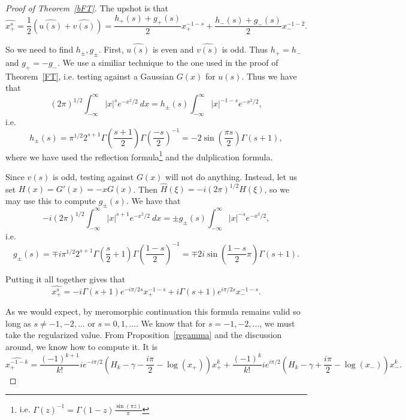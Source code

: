 \documentclass[12pt]{article}
\begin{document}
\begin{proof}[Proof of Theorem~\ref{bFT}]
The upshot is that
\[\widehat{x_+^s} = \frac{1}{2}(\widehat{u(s)} + \widehat{v(s)}) = \frac{h_+(s)+g_+(s)}{2}x_+^{-1-s} + \frac{h_-(s)+g_-(s)}{2}x_-^{-1-2}.\]

So we need to find $h_{\pm},g_{\pm}$.  First, $\widehat{u(s)}$ is even and $\widehat{v(s)}$ is odd. Thus $h_+ = h_-$ and $g_+ = -g_-$. We use a similiar technique to the one used in the proof of Theorem~\ref{FT}, i.e. testing against a Gaussian $G(x)$ for $u(s)$. Thus we have that
\[(2\pi)^{1/2}\int_{-\infty}^\infty |x|^se^{-x^2/2}\ dx = h_{\pm}(s)\int_{-\infty}^\infty|x|^{-1-s}e^{-x^2/2},\]
i.e.
\[h_\pm(s) = \pi^{1/2}2^{s+1}\Gamma\left(\frac{s+1}{2}\right)\Gamma\left(\frac{-s}{2}\right)^{-1} = -2\sin\left(\frac{\pi s}{2}\right)\Gamma(s+1),\]
where we have used the reflection formula\footnote{i.e. $\Gamma(z)^{-1} = \Gamma(1-z)\frac{\sin(\pi z)}{\pi}$} and the dulplication formula.

Since $v(s)$ is odd, testing against $G(x)$ will not do anything. Instead, let us set $H(x) = G'(x) = -xG(x)$. Then $\hat{H}(\xi) = -i(2\pi)^{1/2}H(\xi)$, so we may use this to compute $g_{\pm}(s)$. We have that
\[-i(2\pi)^{1/2}\int_{-\infty}^\infty |x|^{s+1}e^{-x^2/2}\ dx = \pm g_{\pm}(s)\int_{-\infty}^\infty|x|^{-s}e^{-x^2/2},\]
i.e.
\[g_{\pm}(s) = \mp i\pi^{1/2}2^{s+1}\Gamma\left(\frac{s}{2}+1\right)\Gamma\left(\frac{1-s}{2}\right)^{-1} = \mp 2i\sin\left(\frac{1-s}{2}\pi\right)\Gamma(s+1).\]

Putting it all together gives that
\[\widehat{x_+^s} = -i\Gamma(s+1)e^{-i\pi/2 s}x_+^{-1-s} + i\Gamma(s+1)e^{i\pi/2s}x_-^{-1-s}.\]

As we would expect, by meromorphic continuation this formula remains valid so long as $s \neq -1,-2,\ldots$ or $s = 0,1,\ldots$. We know that for $s = -1,-2,\ldots$, we must take the regularized value. From Proposition~\ref{regamma} and the discussion around, we know how to compute it. It is
\[\widehat{x_+^{-1-k}} = \frac{(-1)^{k+1}}{k!}ie^{-i\pi/2}\left(H_k-\gamma-\frac{i\pi}{2}-\log(x_+)\right)x_+^k + \frac{(-1)^{k}}{k!}ie^{i\pi/2}\left(H_k-\gamma+\frac{i\pi}{2}-\log(x_-)\right)x_-^{k}.\]
\end{proof}



\begin{bibdiv}
\begin{biblist}

\newcommand{\perafter}[1]{#1.}


\end{biblist}
\end{bibdiv}
\end{document}
